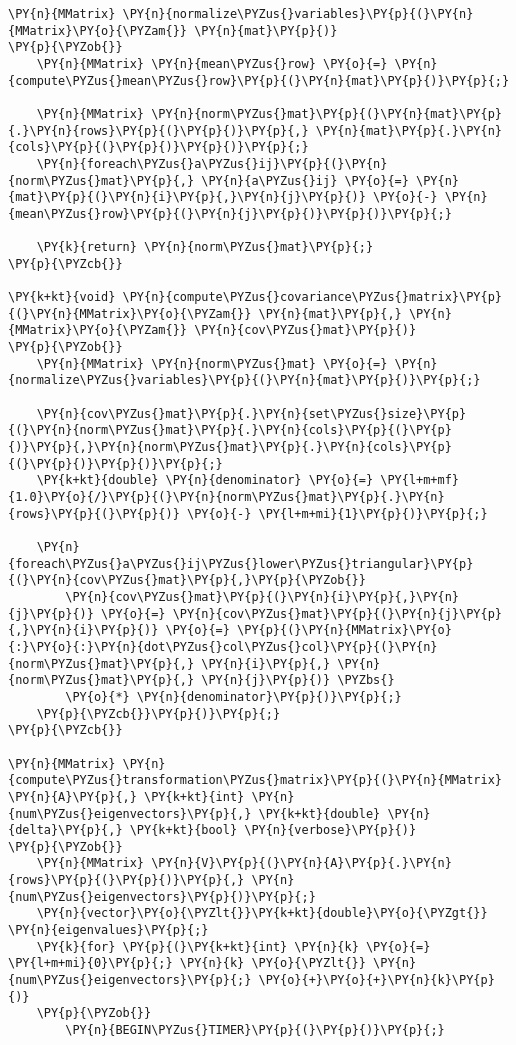\begin{Verbatim}[commandchars=\\\{\}]
\PY{n}{MMatrix} \PY{n}{normalize\PYZus{}variables}\PY{p}{(}\PY{n}{MMatrix}\PY{o}{\PYZam{}} \PY{n}{mat}\PY{p}{)}
\PY{p}{\PYZob{}}
	\PY{n}{MMatrix} \PY{n}{mean\PYZus{}row} \PY{o}{=} \PY{n}{compute\PYZus{}mean\PYZus{}row}\PY{p}{(}\PY{n}{mat}\PY{p}{)}\PY{p}{;}

	\PY{n}{MMatrix} \PY{n}{norm\PYZus{}mat}\PY{p}{(}\PY{n}{mat}\PY{p}{.}\PY{n}{rows}\PY{p}{(}\PY{p}{)}\PY{p}{,} \PY{n}{mat}\PY{p}{.}\PY{n}{cols}\PY{p}{(}\PY{p}{)}\PY{p}{)}\PY{p}{;}
	\PY{n}{foreach\PYZus{}a\PYZus{}ij}\PY{p}{(}\PY{n}{norm\PYZus{}mat}\PY{p}{,} \PY{n}{a\PYZus{}ij} \PY{o}{=} \PY{n}{mat}\PY{p}{(}\PY{n}{i}\PY{p}{,}\PY{n}{j}\PY{p}{)} \PY{o}{-} \PY{n}{mean\PYZus{}row}\PY{p}{(}\PY{n}{j}\PY{p}{)}\PY{p}{)}\PY{p}{;}

	\PY{k}{return} \PY{n}{norm\PYZus{}mat}\PY{p}{;}
\PY{p}{\PYZcb{}}

\PY{k+kt}{void} \PY{n}{compute\PYZus{}covariance\PYZus{}matrix}\PY{p}{(}\PY{n}{MMatrix}\PY{o}{\PYZam{}} \PY{n}{mat}\PY{p}{,} \PY{n}{MMatrix}\PY{o}{\PYZam{}} \PY{n}{cov\PYZus{}mat}\PY{p}{)}
\PY{p}{\PYZob{}}
	\PY{n}{MMatrix} \PY{n}{norm\PYZus{}mat} \PY{o}{=} \PY{n}{normalize\PYZus{}variables}\PY{p}{(}\PY{n}{mat}\PY{p}{)}\PY{p}{;}

	\PY{n}{cov\PYZus{}mat}\PY{p}{.}\PY{n}{set\PYZus{}size}\PY{p}{(}\PY{n}{norm\PYZus{}mat}\PY{p}{.}\PY{n}{cols}\PY{p}{(}\PY{p}{)}\PY{p}{,}\PY{n}{norm\PYZus{}mat}\PY{p}{.}\PY{n}{cols}\PY{p}{(}\PY{p}{)}\PY{p}{)}\PY{p}{;}
	\PY{k+kt}{double} \PY{n}{denominator} \PY{o}{=} \PY{l+m+mf}{1.0}\PY{o}{/}\PY{p}{(}\PY{n}{norm\PYZus{}mat}\PY{p}{.}\PY{n}{rows}\PY{p}{(}\PY{p}{)} \PY{o}{-} \PY{l+m+mi}{1}\PY{p}{)}\PY{p}{;}

	\PY{n}{foreach\PYZus{}a\PYZus{}ij\PYZus{}lower\PYZus{}triangular}\PY{p}{(}\PY{n}{cov\PYZus{}mat}\PY{p}{,}\PY{p}{\PYZob{}}
		\PY{n}{cov\PYZus{}mat}\PY{p}{(}\PY{n}{i}\PY{p}{,}\PY{n}{j}\PY{p}{)} \PY{o}{=} \PY{n}{cov\PYZus{}mat}\PY{p}{(}\PY{n}{j}\PY{p}{,}\PY{n}{i}\PY{p}{)} \PY{o}{=} \PY{p}{(}\PY{n}{MMatrix}\PY{o}{:}\PY{o}{:}\PY{n}{dot\PYZus{}col\PYZus{}col}\PY{p}{(}\PY{n}{norm\PYZus{}mat}\PY{p}{,} \PY{n}{i}\PY{p}{,} \PY{n}{norm\PYZus{}mat}\PY{p}{,} \PY{n}{j}\PY{p}{)} \PYZbs{}
		\PY{o}{*} \PY{n}{denominator}\PY{p}{)}\PY{p}{;}
	\PY{p}{\PYZcb{}}\PY{p}{)}\PY{p}{;}
\PY{p}{\PYZcb{}}

\PY{n}{MMatrix} \PY{n}{compute\PYZus{}transformation\PYZus{}matrix}\PY{p}{(}\PY{n}{MMatrix} \PY{n}{A}\PY{p}{,} \PY{k+kt}{int} \PY{n}{num\PYZus{}eigenvectors}\PY{p}{,} \PY{k+kt}{double} \PY{n}{delta}\PY{p}{,} \PY{k+kt}{bool} \PY{n}{verbose}\PY{p}{)}
\PY{p}{\PYZob{}}
	\PY{n}{MMatrix} \PY{n}{V}\PY{p}{(}\PY{n}{A}\PY{p}{.}\PY{n}{rows}\PY{p}{(}\PY{p}{)}\PY{p}{,} \PY{n}{num\PYZus{}eigenvectors}\PY{p}{)}\PY{p}{;}
	\PY{n}{vector}\PY{o}{\PYZlt{}}\PY{k+kt}{double}\PY{o}{\PYZgt{}} \PY{n}{eigenvalues}\PY{p}{;}
	\PY{k}{for} \PY{p}{(}\PY{k+kt}{int} \PY{n}{k} \PY{o}{=} \PY{l+m+mi}{0}\PY{p}{;} \PY{n}{k} \PY{o}{\PYZlt{}} \PY{n}{num\PYZus{}eigenvectors}\PY{p}{;} \PY{o}{+}\PY{o}{+}\PY{n}{k}\PY{p}{)}
	\PY{p}{\PYZob{}}
		\PY{n}{BEGIN\PYZus{}TIMER}\PY{p}{(}\PY{p}{)}\PY{p}{;}


\end{Verbatim}
